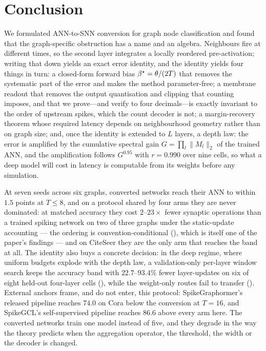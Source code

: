 \section{Conclusion}
\label{sec:conclusion}

We formulated ANN-to-SNN conversion for graph node classification and found that the graph-specific
obstruction has a name and an algebra. Neighbours fire at different times, so the second layer
integrates a locally reordered pre-activation; writing that down yields an exact error identity, and
the identity yields four things in turn: a closed-form forward bias $\beta^{\star} = \theta/(2T)$ that
removes the systematic part of the error and makes the method parameter-free; a membrane readout
that removes the output quantisation and clipping that counting imposes, and that we prove---and
verify to four decimals---is exactly invariant to the order of upstream spikes, which the count
decoder is not; a margin-recovery theorem whose required latency depends on neighbourhood geometry
rather than on graph size; and, once the identity is extended to $L$ layers, a depth law: the error
is amplified by the cumulative spectral gain $G=\prod_l\lVert M_l\rVert_2$ of the trained ANN, and
the amplification follows $G^{0.95}$ with $r=0.990$ over nine cells, so what a deep model will cost
in latency is computable from its weights before any simulation.

At seven seeds across six graphs, converted networks reach their ANN to within $1.5$ points at
$T \le 8$, and on a protocol shared by four arms they are never dominated: at matched accuracy they
cost $2$--$23\times$ fewer synaptic operations than a trained spiking network on two of three graphs
under the static-update accounting --- the ordering is convention-conditional
(), which is itself one of the paper's findings --- and on CiteSeer they are
the only arm that reaches the band at all. The identity also buys a concrete decision: in the deep
regime, where uniform budgets explode with the depth law, a validation-only per-layer window search
keeps the accuracy band with $22.7$--$93.4\%$ fewer layer-updates on six of eight held-out
four-layer cells (), while the weight-only routes fail to transfer
(). External anchors frame, and do not enter, this protocol: SpikeGraphormer's
released pipeline reaches $74.0$ on Cora below the conversion at $T=16$, and SpikeGCL's
self-supervised pipeline reaches $86.6$ above every arm here. The converted networks train one
model instead of five, and they degrade in the way the theory predicts when the aggregation
operator, the threshold, the width or the decoder is changed.


